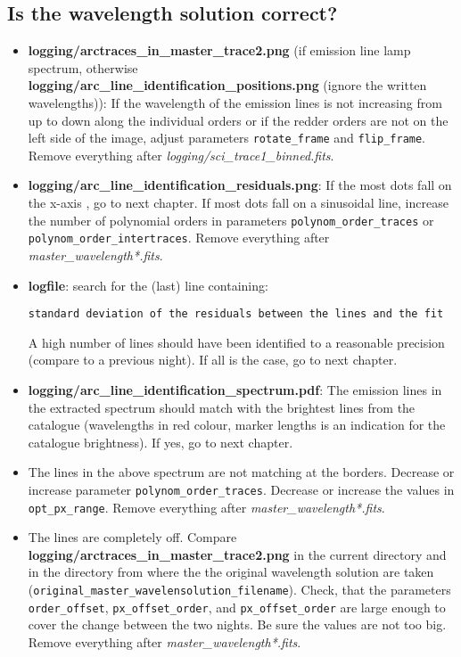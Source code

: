 \documentclass[10pt,a4paper]{article}
\begin{document}
\subsection{Is the wavelength solution correct?}
\label{Section:FAQ_wavelength_solution}
\begin{itemize}
  \item \textbf{logging/arctraces\_in\_master\_trace2.png} (if emission line lamp spectrum, otherwise\\ \textbf{logging/arc\_line\_identification\_positions.png} (ignore the written wavelengths)): If the wavelength of the emission lines is not increasing from up to down along the individual orders or if the redder orders are not on the left side of the image, adjust parameters \verb|rotate_frame| and \verb|flip_frame|. Remove everything after \textit{logging/sci\_trace1\_binned.fits}.
  \item \textbf{logging/arc\_line\_identification\_residuals.png}: If the most dots fall on the x-axis , go to next chapter. If most dots fall on a sinusoidal line, increase the number of polynomial orders in parameters \verb|polynom_order_traces| or \verb|polynom_order_intertraces|. Remove everything after \textit{master\_wavelength*.fits}.
  \item \textbf{logfile}: search for the (last) line containing:
  \begin{lstlisting}[style=base]
 standard deviation of the residuals between the lines and the fit
  \end{lstlisting}
  A high number of lines should have been identified to a reasonable precision (compare to a previous night). If all is the case, go to next chapter.
  \item \textbf{logging/arc\_line\_identification\_spectrum.pdf}: The emission lines in the extracted spectrum should match with the brightest lines from the catalogue (wavelengths in red colour, marker lengths is an indication for the catalogue brightness). If yes, go to next chapter.
  \item The lines in the above spectrum are not matching at the borders. Decrease or increase parameter \verb|polynom_order_traces|. Decrease or increase the values in \verb|opt_px_range|. Remove everything after \textit{ master\_wavelength*.fits}.
  \item The lines are completely off. Compare \textbf{logging/arctraces\_in\_master\_trace2.png} in the current directory and in the directory from where the the original wavelength solution are taken (\verb|original_master_wavelensolution_filename|). Check, that the parameters \verb|order_offset|, \verb|px_offset_order|, and \verb|px_offset_order| are large enough to cover the change between the two nights. Be sure the values are not too big. Remove everything after \textit{master\_wavelength*.fits}.
\end{itemize}
\end{document}
